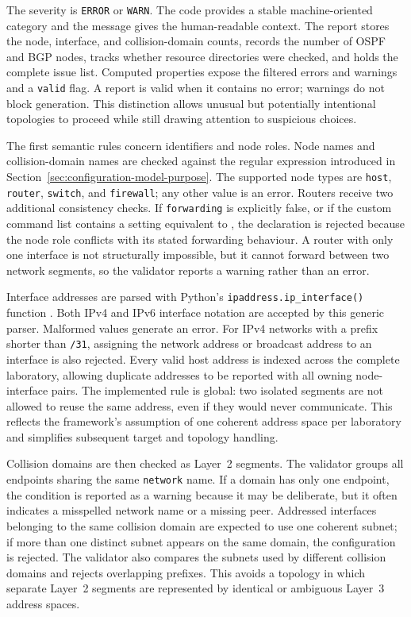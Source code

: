 The severity is \texttt{ERROR} or \texttt{WARN}. The code provides a stable
machine-oriented category and the message gives the human-readable context.
The report stores the node, interface, and collision-domain counts, records the
number of OSPF and BGP nodes, tracks whether resource directories were checked,
and holds the complete issue list. Computed properties expose the filtered
errors and warnings and a \texttt{valid} flag. A report is valid when it
contains no error; warnings do not block generation. This distinction allows
unusual but potentially intentional topologies to proceed while still drawing
attention to suspicious choices.

The first semantic rules concern identifiers and node roles. Node names and
collision-domain names are checked against the regular expression introduced
in Section~\ref{sec:configuration-model-purpose}. The supported node types are
\texttt{host}, \texttt{router}, \texttt{switch}, and \texttt{firewall}; any
other value is an error. Routers receive two additional consistency checks. If
\texttt{forwarding} is explicitly false, or if the custom command list
contains a setting equivalent to , the declaration is
rejected because the node role conflicts with its stated forwarding
behaviour. A router with only one interface is not structurally impossible,
but it cannot forward between two network segments, so the validator reports a
warning rather than an error.

Interface addresses are parsed with Python's \texttt{ipaddress.ip\_interface()}
function \cite{python_ipaddress}. Both IPv4 and IPv6 interface notation are
accepted by this generic parser. Malformed values generate an error. For IPv4 networks with a prefix
shorter than \texttt{/31}, assigning the network address or broadcast address
to an interface is also rejected. Every valid host address is indexed across
the complete laboratory, allowing duplicate addresses to be reported with all
owning node-interface pairs. The implemented rule is global: two isolated
segments are not allowed to reuse the same address, even if they would never
communicate. This reflects the framework's assumption of one coherent address
space per laboratory and simplifies subsequent target and topology handling.

Collision domains are then checked as Layer~2 segments. The validator groups
all endpoints sharing the same \texttt{network} name. If a domain has only one
endpoint, the condition is reported as a warning because it may be deliberate,
but it often indicates a misspelled network name or a missing peer. Addressed
interfaces belonging to the same collision domain are expected to use one
coherent subnet; if more than one distinct subnet appears on the same domain,
the configuration is rejected. The validator also compares the subnets used by
different collision domains and rejects overlapping prefixes. This avoids a
topology in which separate Layer~2 segments are represented by identical or
ambiguous Layer~3 address spaces.

